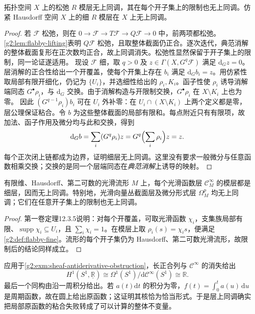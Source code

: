 \begin{theorem}\label{g2:thm:flabby-fine-acyclic}
	拓扑空间 \(X\) 上的松弛 \(R\) 模层无上同调，其在每个开子集上的限制也无上同调。仿紧 Hausdorff 空间 \(X\) 上的细 \(R\) 模层在 \(X\) 上无上同调。
\end{theorem}
\begin{proof}
	若 \(\mathcal F\) 松弛，则在 \(0\to\mathcal F\to T\mathcal F\to Q\mathcal F\to0\) 中，前两项都松弛。\cref{g2:lem:flabby-lifting}表明 \(Q\mathcal F\) 松弛，且取整体截面仍正合。逐次迭代，典范消解的整体截面复形在正次数均正合，故上同调消失。松弛性显然保留于开子集上的限制，同一论证遂适用。
	现设 \(\mathcal F\) 细，取 \(q>0\) 及 \(z\in\Gamma(X,G^q\mathcal F)\) 满足 \(\mathrm d_Gz=0\)。层消解的正合性给出一个开覆盖，使每个开集上存在 \(b_i\) 满足 \(\mathrm d_Gb_i=z\)。用仿紧性取局部有限开细化，仍记为 \(\{U_i\}\)，并选细性给出的 \(\rho_i,K_i\)。函子性使 \(\rho_i\) 诱导消解端同态 \(G^\bullet\rho_i\)，与 \(\mathrm d_G\) 交换。由于消解构造与开限制交换，\(G^\bullet\rho_i\) 在 \(X\setminus K_i\) 上也为零。
	因此 \((G^{q-1}\rho_i)b_i\) 可在 \(U_i\) 外补零：在 \(U_i\cap(X\setminus K_i)\) 上两个定义都是零，层公理保证粘合。令 \(b\) 为这些整体截面的局部有限和。每点附近只有有限项，故加法、函子作用及微分均与此和交换，得到
	\[
		\mathrm d_Gb=\sum_i(G^q\rho_i)z
		=G^q\Bigl(\sum_i\rho_i\Bigr)z=z.
	\]
	每个正次闭上链都成为边界，证明细层无上同调。这里没有要求一般微分与任意函数相乘交换；交换的是同一个层端同态在\emph{典范消解}上诱导的映射。
\end{proof}

\begin{corollary}\label{g2:cor:smooth-module-acyclic}
	有限维、Hausdorff、第二可数的光滑流形 \(M\) 上，每个光滑函数层 \(\mathcal C^{\infty}_M\) 的模层都是细层，因而无上同调。特别地，光滑向量丛截面层及微分形式层 \(\Omega^p_M\) 均无上同调；它们在任意开子集上的限制也无上同调。
\end{corollary}
\begin{proof}
	第一卷定理12.3.5说明：对每个开覆盖，可取光滑函数 \(\chi_i\)，支集族局部有限、\(\operatorname{supp}\chi_i\subseteq U_i\)，且 \(\sum_i\chi_i=1\)。在模层上取 \(\rho_i(s)=\chi_i s\)，便满足\cref{g2:def:flabby-fine}。流形的每个开子集仍为 Hausdorff、第二可数光滑流形，故限制后的结论同样成立。
\end{proof}

应用于\cref{g2:exm:sheaf-antiderivative-obstruction}，长正合列与 \(\mathcal C^{\infty}\) 的消失给出
\[
	H^1(S^1,\underline{\mathbb R})
	\cong\Omega^1(S^1)/\mathrm d\mathcal C^{\infty}(S^1)\cong\mathbb R.
\]
最后一个同构由沿一周积分给出。若 \(a(t)\mathrm dt\) 的积分为零，\(f(t)=\int_0^t a(u)\,\mathrm du\) 是周期函数，故在圆上给出原函数；这证明其核恰为恰当形式。于是层上同调确实把局部原函数的粘合失败转成了可以计算的整体不变量。

